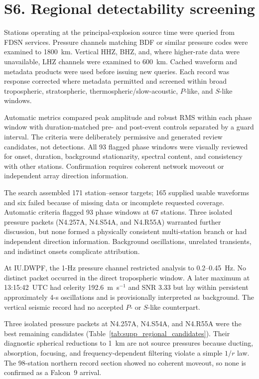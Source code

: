 \documentclass[]{seismica}
\begin{document}
\FloatBarrier
\section*{S6. Regional detectability screening}
\label{sec:supp_regional}

Stations operating at the principal-explosion source time were queried from
FDSN services. Pressure channels matching BDF or similar pressure codes were
examined to 1800~km. Vertical HHZ, BHZ, and, where higher-rate data were
unavailable, LHZ channels were examined to 600~km. Cached waveform and metadata
products were used before issuing new queries. Each record was response
corrected where metadata permitted and screened within broad tropospheric,
stratospheric, thermospheric/slow-acoustic, $P$-like, and $S$-like windows.

Automatic metrics compared peak amplitude and robust RMS within each phase
window with duration-matched pre- and post-event controls separated by a guard
interval. The criteria were deliberately permissive and generated review
candidates, not detections. All 93 flagged phase windows were visually
reviewed for onset, duration, background stationarity, spectral content, and
consistency with other stations. Confirmation requires coherent network
moveout or independent array direction information.

The search assembled 171 station--sensor targets; 165 supplied usable
waveforms and six failed because of missing data or incomplete requested
coverage. Automatic criteria flagged 93 phase windows at 67 stations. Three
isolated pressure packets (N4.257A, N4.S54A, and N4.R55A) warranted further
discussion, but none formed a physically consistent multi-station branch or
had independent direction information. Background oscillations, unrelated
transients, and indistinct onsets complicate attribution.

At IU.DWPF, the 1-Hz pressure channel restricted analysis to 0.2--0.45~Hz. No
distinct packet occurred in the direct tropospheric window. A later maximum at
13:15:42~UTC had celerity 192.6~m~s$^{-1}$ and SNR 3.33 but lay within
persistent approximately 4-s oscillations and is provisionally interpreted as background. The
vertical seismic record had no accepted $P$- or $S$-like counterpart.

Three isolated pressure packets at N4.257A, N4.S54A, and N4.R55A were the best
remaining candidates (Table~\ref{tab:supp_regional_candidates}). Their
diagnostic spherical reductions to 1~km are not source pressures because
ducting, absorption, focusing, and frequency-dependent filtering violate a
simple $1/r$ law. The 98-station northern record section showed no coherent
moveout, so none is confirmed as a Falcon~9 arrival.
\end{document}
